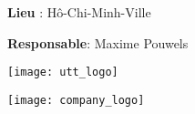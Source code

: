 \documentclass[rapport.tex]{subfiles}
\begin{document}
\begin{titlepage}
\begin{adjustwidth}{0.5cm}{1cm}
{\begin{minipage}[c][4cm]{0.45\textwidth}
        \vspace{0.75cm}

        \textbf{Lieu }: Hô-Chi-Minh-Ville

        \vspace{0.75cm}

        \textbf{Responsable}: Maxime Pouwels

        \vspace{0.75cm}
    \end{minipage}
    }
    \hspace{0.2cm}
    \end{adjustwidth}

    \begin{adjustwidth}{0cm}{0cm}
    \begin{minipage}[b][5cm]{0.5\textwidth}
        \texttt{[image: utt\_logo]}
    \end{minipage}
    \hspace{5cm}
    \begin{minipage}[b][5cm]{0.5\textwidth}
        \texttt{[image: company\_logo]}
    \end{minipage}
    \end{adjustwidth}
\end{titlepage}
\end{document}
